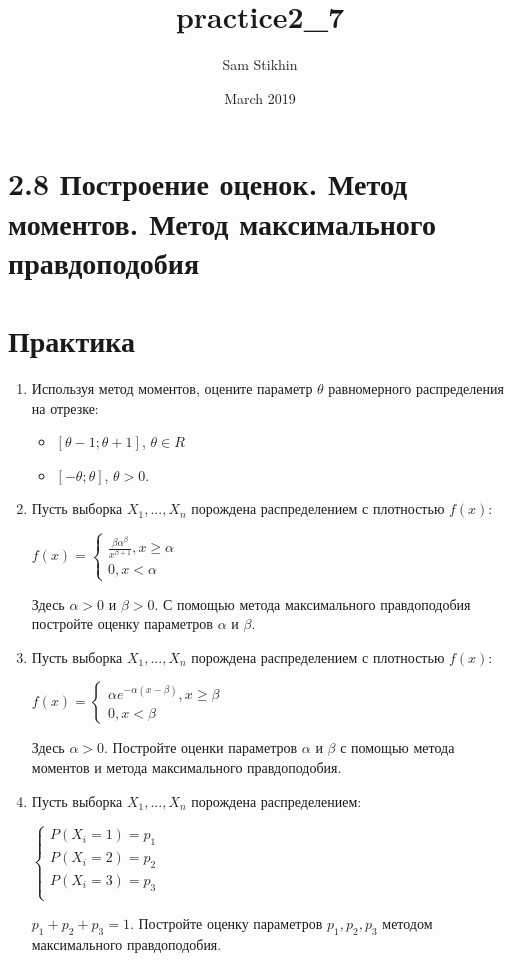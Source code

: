 \documentclass[a4paper, 14pt]{extarticle}
\title{practice2_7}
\author{Sam Stikhin}
\date{March 2019}
\begin{document}
\section*{2.8 Построение оценок. Метод моментов. Метод максимального правдоподобия}
\section{Практика}
\begin{enumerate}
	\item Используя метод моментов, оцените параметр $\theta$ 	равномерного распределения на отрезке:
	\begin{itemize}
		\item $\left[\theta - 1; \theta + 1\right]$, $\theta \in R$
		\item $\left[-\theta; \theta\right]$, $\theta > 0$.
	\end{itemize}
	
	\item Пусть выборка $X_1, ..., X_n$ порождена распределением с плотностью $f(x)$:
	\begin{center}
		$f(x) = \begin{cases}
			\frac{\beta \alpha^{\beta}}{x^{\beta + 1}}, x \ge \alpha\\
			0, x < \alpha
		\end{cases}$
	\end{center}
	Здесь $\alpha > 0$ и $\beta > 0$. С помощью метода максимального правдоподобия постройте оценку параметров $\alpha$ и $\beta$.
	
	\item Пусть выборка $X_1, ..., X_n$ порождена распределением с плотностью $f(x)$:
	\begin{center}
		$f(x) = \begin{cases}
			\alpha e^{-\alpha\left(x - \beta\right)}, x \ge \beta\\
			0, x < \beta
		\end{cases}$
	\end{center}
	Здесь $\alpha > 0$. Постройте оценки параметров $\alpha$ и $\beta$ с помощью метода моментов и метода максимального правдоподобия.
	
	\item Пусть выборка $X_1, ..., X_n$ порождена распределением:
	\begin{center}
		$\begin{cases}
			P(X_i = 1) = p_1\\
			P(X_i = 2) = p_2\\
			P(X_i = 3) = p_3\\
		\end{cases}$
	\end{center}
	$p_1 + p_2 + p_3 = 1$. Постройте оценку параметров $p_1, p_2, p_3$ методом максимального правдоподобия.
\end{enumerate}
\newpage
\end{document}
